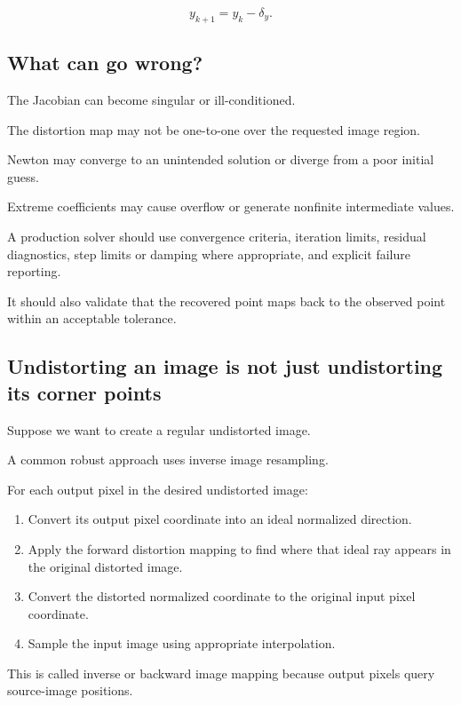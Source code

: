\[
 \boxed{ y_{k+1}=y_k-\delta_y }.
\]

\subsection{What can go wrong?}\label{02-foundations-ii-ch035-what-can-go-wrong}

The Jacobian can become singular or ill-conditioned.

The distortion map may not be one-to-one over the requested image region.

Newton may converge to an unintended solution or diverge from a poor initial guess.

Extreme coefficients may cause overflow or generate nonfinite intermediate values.

A production solver should use convergence criteria, iteration limits, residual diagnostics, step limits or damping where appropriate, and explicit failure reporting.

It should also validate that the recovered point maps back to the observed point within an acceptable tolerance.

\subsection{Undistorting an image is not just undistorting its corner points}\label{02-foundations-ii-ch035-undistorting-an-image-is-not-just-undistorting-its-corner-points}

Suppose we want to create a regular undistorted image.

A common robust approach uses inverse image resampling.

For each output pixel in the desired undistorted image:

\begin{enumerate}
\def\labelenumi{\arabic{enumi}.}
\tightlist
\item
  Convert its output pixel coordinate into an ideal normalized direction.
\item
  Apply the forward distortion mapping to find where that ideal ray appears in the original distorted image.
\item
  Convert the distorted normalized coordinate to the original input pixel coordinate.
\item
  Sample the input image using appropriate interpolation.
\end{enumerate}

This is called inverse or backward image mapping because output pixels query source-image positions.

